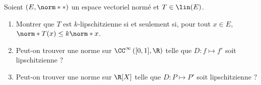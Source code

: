 \begin{enonce}
\begin{exercise}[ID={RMS 122 E951 Centrale PSI},subtitle={},tags={}, difficulty={0}]
  Soient $\left( E,\norm** \right)$ un espace vectoriel normé et $T\in\lin(E)$.
  \begin{enumerate}
    \item 
  Montrer que $T$ est $k$-lipschitzienne si et seulement si, pour tout $x\in E$, $\norm*{T(x)}\leq k\norm*x$.
\item 
  Peut-on trouver une norme sur $\CC^\infty\left( [0,1],\R \right)$ telle que $D:f\mapsto f'$ soit lipschitzienne ?
\item
  Peut-on trouver une norme sur $\R[X]$ telle que $D:P\mapsto P'$ soit lipschitzienne ?
  \end{enumerate}
\end{exercise}
\begin{solution}
\end{solution}
\end{enonce}
